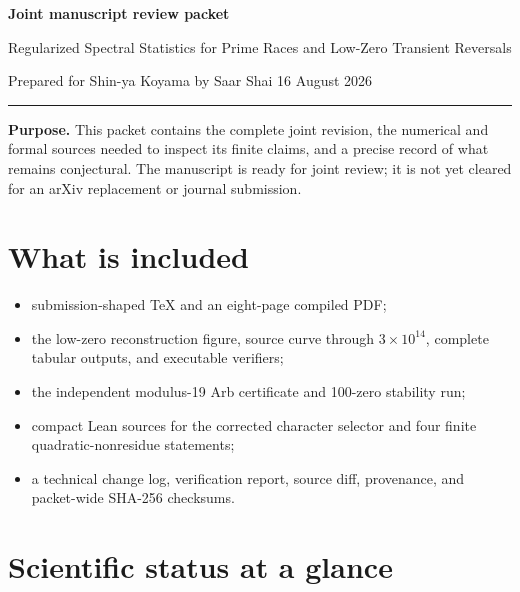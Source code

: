 \documentclass[11pt]{article}
\begin{document}
{\Large\bfseries\color{navy} Joint manuscript review packet}\par
{\large Regularized Spectral Statistics for Prime Races and Low-Zero Transient Reversals}\par
\vspace{3pt}
Prepared for Shin-ya Koyama by Saar Shai \hfill 16 August 2026

\vspace{5pt}\hrule\vspace{7pt}

\textbf{Purpose.} This packet contains the complete joint revision, the
numerical and formal sources needed to inspect its finite claims, and a precise
record of what remains conjectural. The manuscript is ready for joint review;
it is not yet cleared for an arXiv replacement or journal submission.

\section*{What is included}

\begin{itemize}
  \item submission-shaped TeX and an eight-page compiled PDF;
  \item the low-zero reconstruction figure, source curve through
  $3\times10^{14}$, complete tabular outputs, and executable verifiers;
  \item the independent modulus-19 Arb certificate and 100-zero stability run;
  \item compact Lean sources for the corrected character selector and four
  finite quadratic-nonresidue statements;
  \item a technical change log, verification report, source diff, provenance,
  and packet-wide SHA-256 checksums.
\end{itemize}

\section*{Scientific status at a glance}
\end{document}

